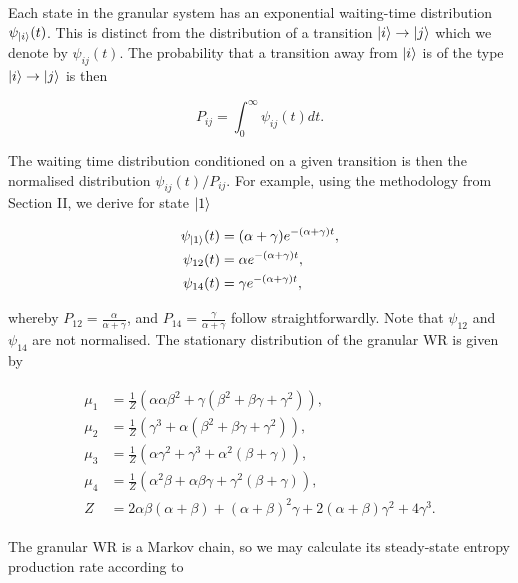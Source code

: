 Each state in the granular system has an exponential waiting-time distribution $\psi_{\ket{i}}(t)$. This is distinct from the distribution of a transition $\ket{i} \rightarrow \ket{j}$ which we denote by $\psi_{ij}(t)$. The probability that a transition away from $\ket{i}$ is of the type $\ket{i} \rightarrow \ket{j}$ is then

\begin{equation}
    P_{ij} = \int_0^\infty \psi_{i j}(t)dt.
\end{equation}

The waiting time distribution conditioned on a given transition is then the normalised distribution $\psi_{ij}(t)/P_{ij}$. For example, using the methodology from Section II, we derive for state $\ket{1}$

\begin{align}
    \begin{split}
        \psi_{\ket{1}}(t) &= (\alpha + \gamma) e^{-(\alpha + \gamma)t},\\
        \psi_{12}(t) &= \alpha e^{-(\alpha + \gamma)t},\\
        \psi_{14}(t) &= \gamma e^{-(\alpha + \gamma)t},
    \end{split}
\end{align}

whereby $P_{12} = \frac{\alpha}{\alpha + \gamma}$, and $P_{14} = \frac{ \gamma}{ \alpha + \gamma}$ follow straightforwardly. Note that $\psi_{12}$ and $\psi_{14}$ are not normalised. The stationary distribution of the granular WR is given by 

\begin{align}\label{granular}
\begin{split}
\mu_1 &= \frac{1}{Z} \left(\alpha \alpha\beta^2 + \gamma(\beta^2 +\beta\gamma + \gamma^2) \right),\\
\mu_2 &= \frac{1}{Z}\left(\gamma^3 + \alpha(\beta^2 + \beta\gamma + \gamma^2)\right),\\ 
\mu_3 &= \frac{1}{Z}\left(\alpha\gamma^2 + \gamma^3 +\alpha^2(\beta+\gamma)\right),\\ 
\mu_4 &= \frac{1}{Z}\left(\alpha^2\beta +\alpha\beta\gamma+\gamma^2(\beta+\gamma)\right),\\
Z &= 2\alpha\beta(\alpha + \beta) +(\alpha+\beta)^2\gamma+2(\alpha+\beta)\gamma^2 +4\gamma^3.
\end{split}
\end{align}

The granular WR is a Markov chain, so we may calculate its steady-state entropy production rate according to \cite{schnakenberg1976network}

